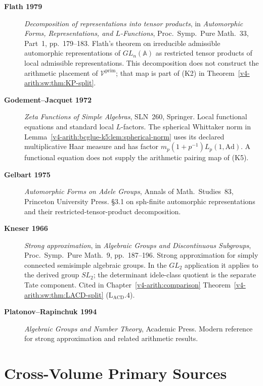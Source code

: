 \begin{description}
\item[\textbf{Flath 1979}] \emph{Decomposition of representations
into tensor products}, in \emph{Automorphic Forms, Representations,
and \(L\)-Functions}, Proc.~Symp.~Pure Math.~33, Part~1,
pp.~179--183. Flath's theorem on irreducible admissible
automorphic representations of \(GL_{n}(\mathbb{A})\) as restricted
tensor products of local admissible representations. This decomposition does not construct the arithmetic placement
of \(\mathcal V^{\mathrm{prim}}\); that map is part of (K2) in
Theorem~\ref{v4-arith:sw:thm:KP-split}.
\item[\textbf{Godement--Jacquet 1972}] \emph{Zeta Functions of
Simple Algebras}, SLN~260, Springer. Local functional equations and
standard local \(L\)-factors. The spherical Whittaker norm in
Lemma~\ref{v4-arith:bcglue-k5:lem:spherical-norm} uses its declared
multiplicative Haar measure and has factor
\(m_p(1+p^{-1})L_p(1,\mathrm{Ad})\). A functional equation does not
supply the arithmetic pairing map of (K5).
\item[\textbf{Gelbart 1975}] \emph{Automorphic Forms on Adele
Groups}, Annals of Math.~Studies~83, Princeton University Press.
\S3.1 on sph-finite automorphic representations and their
restricted-tensor-product decomposition.
\item[\textbf{Kneser 1966}] \emph{Strong approximation}, in
\emph{Algebraic Groups and Discontinuous Subgroups}, Proc.~Symp.~Pure
Math.~9, pp.~187--196. Strong approximation for simply connected
semisimple algebraic groups. In the \(GL_{2}\) application it applies
to the derived group \(SL_{2}\); the determinant idele-class quotient
is the separate Tate component. Cited in
Chapter~\ref{v4-arith:comparison}
Theorem~\ref{v4-arith:sw:thm:LACD-split} (\(\mathrm{L}_{\mathrm{ACD}}.4\)).
\item[\textbf{Platonov--Rapinchuk 1994}] \emph{Algebraic Groups and
Number Theory}, Academic Press. Modern reference for strong
approximation and related arithmetic results.
\end{description}


\section{Cross-Volume Primary Sources}
\label{v4-arith:app:A:cross-volume}

